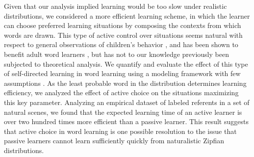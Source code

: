 \documentclass[a4paper,natbib,man]{apa6}
\begin{document}
Given that our analysis implied learning would be too slow under realistic distributions, we considered a more efficient learning scheme, in which the learner can choose preferred learning situations by composing the contexts from which words are drawn. 
This type of active control over situations seems natural with respect to general observations of children's behavior \citep{Yu:2009active}, and has been shown to benefit adult word learners \citep{Kachergis:2013}, but has not to our knowledge previously been subjected to theoretical analysis. 
We quantify and evaluate the effect of this type of self-directed learning in word learning using a modeling framework with few assumptions \citep{Blythe:2010,Vogt:2012,Blythe:2016}. 
As the least probable word in the distribution determines learning efficiency, we analyzed the effect of active choice on the situations maximizing this key parameter. 
Analyzing an empirical dataset of labeled referents in a set of natural scenes, we found that the expected learning time of an active learner is over two hundred times more efficient than a passive learner. 
This result suggests that active choice in word learning is one possible resolution to the issue that passive learners cannot learn sufficiently quickly from naturalistic Zipfian distributions.
\end{document}
